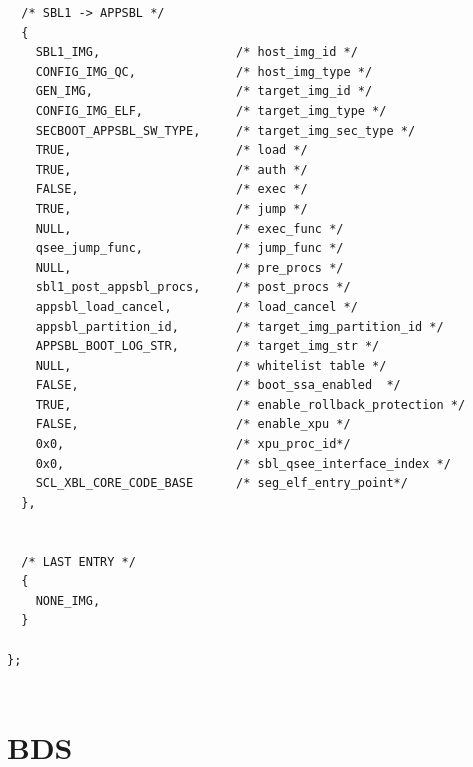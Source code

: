 \begin{lstlisting}
  /* SBL1 -> APPSBL */
  {
    SBL1_IMG,                   /* host_img_id */
    CONFIG_IMG_QC,              /* host_img_type */
    GEN_IMG,                    /* target_img_id */
    CONFIG_IMG_ELF,             /* target_img_type */
    SECBOOT_APPSBL_SW_TYPE,     /* target_img_sec_type */ 
    TRUE,                       /* load */
    TRUE,                       /* auth */
    FALSE,                      /* exec */
    TRUE,                       /* jump */
    NULL,                       /* exec_func */
    qsee_jump_func,             /* jump_func */
    NULL,                       /* pre_procs */ 
    sbl1_post_appsbl_procs,     /* post_procs */
    appsbl_load_cancel,         /* load_cancel */
    appsbl_partition_id,        /* target_img_partition_id */
    APPSBL_BOOT_LOG_STR,        /* target_img_str */
    NULL,                       /* whitelist table */
    FALSE,                      /* boot_ssa_enabled  */
    TRUE,                       /* enable_rollback_protection */
    FALSE,                      /* enable_xpu */
    0x0,                        /* xpu_proc_id*/   
    0x0,                        /* sbl_qsee_interface_index */
    SCL_XBL_CORE_CODE_BASE      /* seg_elf_entry_point*/
  },


  /* LAST ENTRY */
  {
    NONE_IMG,
  }

};


\end{lstlisting}


\section{BDS}
